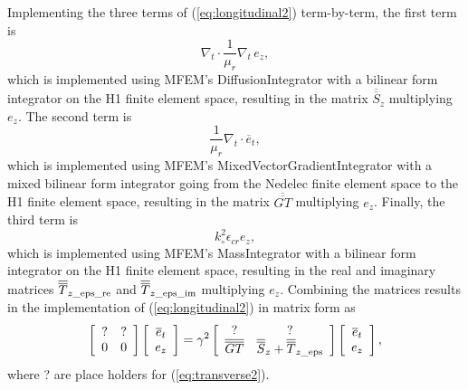 \documentclass[titlepage]{article}
\renewcommand\_{\textunderscore\linebreak[1]}
\begin{document}
Implementing the three terms of (\ref{eq:longitudinal2}) term-by-term, the first term is
\begin{equation}
\nabla_t\cdot\frac{1}{\mu_r}\nabla_t \, e_z,
\end{equation}
which is implemented using MFEM's DiffusionIntegrator with a bilinear form integrator on the H1 finite element space, resulting in the matrix $\overline{\overline{S}}_z$ multiplying $e_z$. The second term is
\begin{equation}
\frac{1}{\mu_r}\nabla_t\cdot\overline{e}_t,
\end{equation}
which is implemented using MFEM's MixedVectorGradientIntegrator with a mixed bilinear form integrator going from the Nedelec finite element space to the H1 finite element space, resulting in the matrix $\overline{\overline{GT}}$ multiplying $e_z$.  Finally, the third term is
\begin{equation}
k_{\circ}^2\epsilon_{cr}e_z,
\end{equation}
which is implemented using MFEM's MassIntegrator with a bilinear form integrator on the H1 finite element space, resulting in the real and imaginary matrices $\overline{\overline{T}}_{z\textnormal{\_eps\_re}}$ and $\overline{\overline{T}}_{z\textnormal{\_eps\_im}}$ multiplying $e_z$. Combining the matrices results in the implementation of (\ref{eq:longitudinal2}) in matrix form as
\begin{equation}
\label{eq:eigen2}
\left[ \begin{array}{cc}
  ? & ? \\
  0 & 0 \\
\end{array} \right]
\left[ \begin{array}{c}
  \overline{e}_t \\
  e_z \\
\end{array} \right] = \gamma^2
\left[ \begin{array}{cc}
   ? & ? \\
  \overline{\overline{GT}} & \overline{\overline{S}}_z + \overline{\overline{T}}_{z\textnormal{\_eps}} \\
\end{array} \right]
\left[ \begin{array}{c}
  \overline{e}_t \\
  e_z \\
\end{array} \right],
\end{equation}
where ? are place holders for (\ref{eq:transverse2}).
\end{document}
